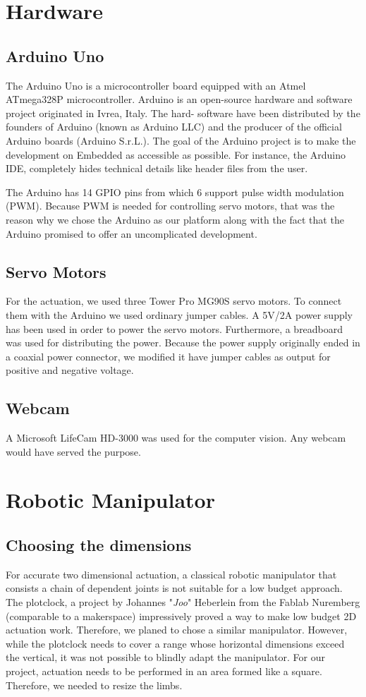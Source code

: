 \documentclass{sig-alternate-05-2015}
\begin{document}
\section{Hardware}
\subsection{Arduino Uno}
The Arduino Uno is a microcontroller board equipped with an Atmel ATmega328P microcontroller. Arduino is an open-source hardware and software project originated in Ivrea, Italy. The hard- software have been distributed by the founders of Arduino (known as Arduino LLC) and the producer of the official Arduino boards (Arduino S.r.L.). The goal of the Arduino project is to make the development on Embedded as accessible as possible. For instance, the Arduino IDE, completely hides technical details like header files from the user.

The Arduino has 14 GPIO pins from which 6 support pulse width modulation (PWM). Because PWM is needed for controlling servo motors, that was the reason why we chose the Arduino as our platform along with the fact that the Arduino promised to offer an uncomplicated development.

\subsection{Servo Motors}
For the actuation, we used three Tower Pro MG90S servo motors. To connect them with the Arduino we used ordinary jumper cables. A 5V/2A power supply has been used in order to power the servo motors. Furthermore, a breadboard was used for distributing the power. Because the power supply originally ended in a coaxial power connector, we modified it have jumper cables as output for positive and negative voltage.

\subsection{Webcam}
A Microsoft LifeCam HD-3000 was used for the computer vision. Any webcam would have served the purpose.

\section{Robotic Manipulator}
\subsection{Choosing the dimensions}
For accurate two dimensional actuation, a classical robotic manipulator that  consists a chain of dependent joints is not suitable for a low budget approach. The plotclock, a project by Johannes "\emph{Joo}" Heberlein from the Fablab Nuremberg (comparable to a makerspace) impressively proved a way to make low budget 2D actuation work. Therefore, we planed to chose a similar manipulator. However, while the plotclock needs to cover a range whose horizontal dimensions exceed the vertical, it was not possible to blindly adapt the manipulator. For our project, actuation needs to be performed in an area formed like a square. Therefore, we needed to resize the limbs.
\end{document}
